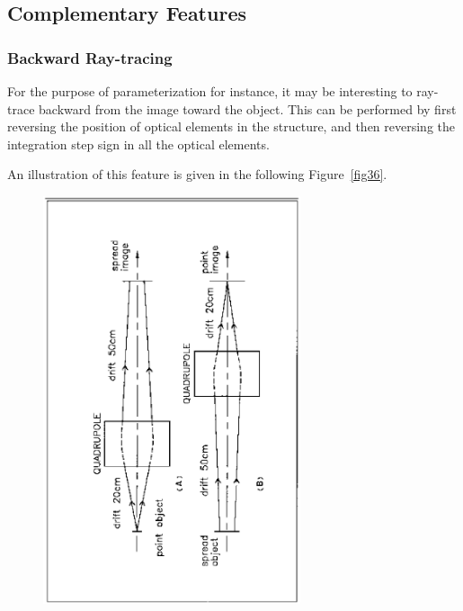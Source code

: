 \subsection{Complementary Features} \label{sec4.6}  

\subsubsection{Backward Ray-tracing} \label{sec4.6.3} 
 

For the purpose of parameterization for instance, it may be interesting to ray-trace 
backward  from the image toward the object.  This can be performed by first 
reversing the position of optical elements in the structure, and then 
reversing the integration step sign in all the optical elements.  
\bigskip

\noindent An illustration of this feature is given in the following
Figure~\ref{fig36}.    


\begin{figure}[H]
\centerline{\includegraphics[height=12cm,angle=-90]{Fig36.ps}}
\end{figure}


